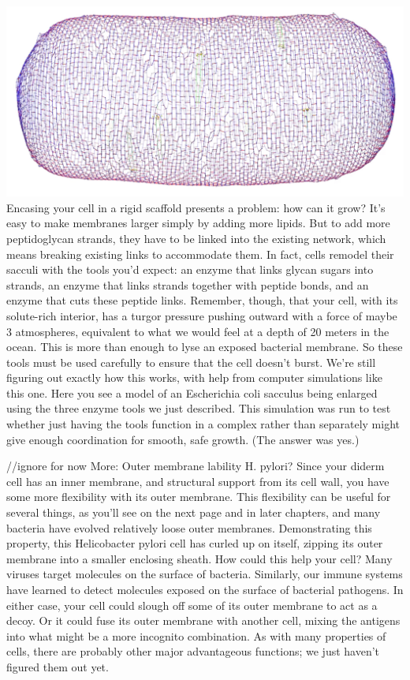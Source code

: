 \documentclass[]{book}
\begin{document}
\includegraphics{img/02_schematic/2_3_2_SacculusRemodeling.jpg} Encasing
your cell in a rigid scaffold presents a problem: how can it grow? It's
easy to make membranes larger simply by adding more lipids. But to add
more peptidoglycan strands, they have to be linked into the existing
network, which means breaking existing links to accommodate them. In
fact, cells remodel their sacculi with the tools you'd expect: an enzyme
that links glycan sugars into strands, an enzyme that links strands
together with peptide bonds, and an enzyme that cuts these peptide
links. Remember, though, that your cell, with its solute-rich interior,
has a turgor pressure pushing outward with a force of maybe 3
atmospheres, equivalent to what we would feel at a depth of 20 meters in
the ocean. This is more than enough to lyse an exposed bacterial
membrane. So these tools must be used carefully to ensure that the cell
doesn't burst. We're still figuring out exactly how this works, with
help from computer simulations like this one. Here you see a model of an
Escherichia coli sacculus being enlarged using the three enzyme tools we
just described. This simulation was run to test whether just having the
tools function in a complex rather than separately might give enough
coordination for smooth, safe growth. (The answer was yes.)

//ignore for now More: Outer membrane lability H. pylori? Since your
diderm cell has an inner membrane, and structural support from its cell
wall, you have some more flexibility with its outer membrane. This
flexibility can be useful for several things, as you'll see on the next
page and in later chapters, and many bacteria have evolved relatively
loose outer membranes. Demonstrating this property, this Helicobacter
pylori cell has curled up on itself, zipping its outer membrane into a
smaller enclosing sheath. How could this help your cell? Many viruses
target molecules on the surface of bacteria. Similarly, our immune
systems have learned to detect molecules exposed on the surface of
bacterial pathogens. In either case, your cell could slough off some of
its outer membrane to act as a decoy. Or it could fuse its outer
membrane with another cell, mixing the antigens into what might be a
more incognito combination. As with many properties of cells, there are
probably other major advantageous functions; we just haven't figured
them out yet.
\end{document}
